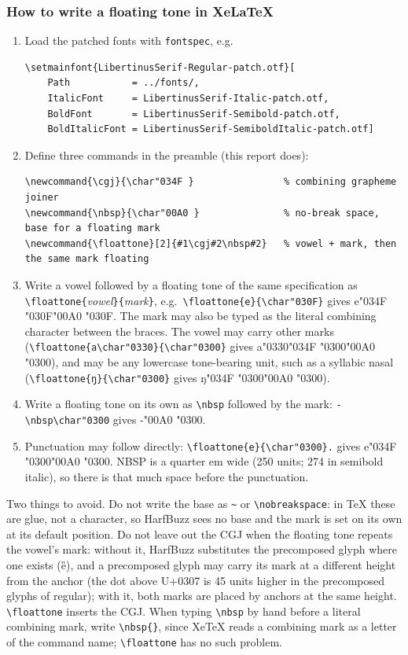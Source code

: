 \documentclass[landscape]{article}
\newcommand{\cgj}{\char"034F }
\newcommand{\nbsp}{\char"00A0 }
\newcommand{\floattone}[2]{#1\cgj#2\nbsp#2}
\begin{document}
\subsubsection*{How to write a floating tone in XeLaTeX}
\begin{enumerate}
\item Load the patched fonts with \verb|fontspec|, e.g.
\begin{verbatim}
\setmainfont{LibertinusSerif-Regular-patch.otf}[
    Path           = ../fonts/,
    ItalicFont     = LibertinusSerif-Italic-patch.otf,
    BoldFont       = LibertinusSerif-Semibold-patch.otf,
    BoldItalicFont = LibertinusSerif-SemiboldItalic-patch.otf]
\end{verbatim}
\item Define three commands in the preamble (this report does):
\begin{verbatim}
\newcommand{\cgj}{\char"034F }                % combining grapheme joiner
\newcommand{\nbsp}{\char"00A0 }               % no-break space, base for a floating mark
\newcommand{\floattone}[2]{#1\cgj#2\nbsp#2}   % vowel + mark, then the same mark floating
\end{verbatim}
\item Write a vowel followed by a floating tone of the same specification as \verb|\floattone{|\emph{vowel}\verb|}{|\emph{mark}\verb|}|, e.g.\ \verb|\floattone{e}{\char"030F}| gives {\LibertinusSerifPatch\floattone{e}{\char"030F}}.
The mark may also be typed as the literal combining character between the braces.
The vowel may carry other marks (\verb|\floattone{a\char"0330}{\char"0300}| gives {\LibertinusSerifPatch\floattone{a\char"0330}{\char"0300}}), and may be any lowercase tone-bearing unit, such as a syllabic nasal (\verb|\floattone{ŋ}{\char"0300}| gives {\LibertinusSerifPatch\floattone{ŋ}{\char"0300}}).
\item Write a floating tone on its own as \verb|\nbsp| followed by the mark: \verb|-\nbsp\char"0300| gives {\LibertinusSerifPatch -\nbsp\char"0300}.
\item Punctuation may follow directly: \verb|\floattone{e}{\char"0300}.| gives {\LibertinusSerifPatch\floattone{e}{\char"0300}.}
NBSP is a quarter em wide (250 units; 274 in semibold italic), so there is that much space before the punctuation.
\end{enumerate}
Two things to avoid.
Do not write the base as \verb|~| or \verb|\nobreakspace|: in TeX these are glue, not a character, so HarfBuzz sees no base and the mark is set on its own at its default position.
Do not leave out the CGJ when the floating tone repeats the vowel's mark: without it, HarfBuzz substitutes the precomposed glyph where one exists (ȅ), and a precomposed glyph may carry its mark at a different height from the anchor (the dot above U+0307 is 45 units higher in the precomposed glyphs of regular); with it, both marks are placed by anchors at the same height.
\verb|\floattone| inserts the CGJ.
When typing \verb|\nbsp| by hand before a literal combining mark, write \verb|\nbsp{}|, since XeTeX reads a combining mark as a letter of the command name; \verb|\floattone| has no such problem.
\end{document}
